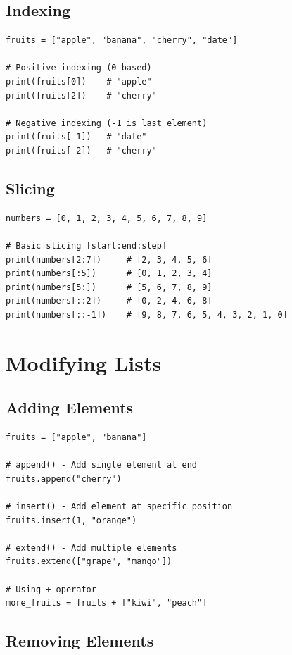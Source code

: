 \documentclass[12pt,a4paper]{article}
\begin{document}
\subsection{Indexing}

\begin{lstlisting}
fruits = ["apple", "banana", "cherry", "date"]

# Positive indexing (0-based)
print(fruits[0])    # "apple"
print(fruits[2])    # "cherry"

# Negative indexing (-1 is last element)
print(fruits[-1])   # "date"
print(fruits[-2])   # "cherry"
\end{lstlisting}

\subsection{Slicing}

\begin{lstlisting}
numbers = [0, 1, 2, 3, 4, 5, 6, 7, 8, 9]

# Basic slicing [start:end:step]
print(numbers[2:7])     # [2, 3, 4, 5, 6]
print(numbers[:5])      # [0, 1, 2, 3, 4]
print(numbers[5:])      # [5, 6, 7, 8, 9]
print(numbers[::2])     # [0, 2, 4, 6, 8]
print(numbers[::-1])    # [9, 8, 7, 6, 5, 4, 3, 2, 1, 0]
\end{lstlisting}

\section{Modifying Lists}

\subsection{Adding Elements}

\begin{lstlisting}
fruits = ["apple", "banana"]

# append() - Add single element at end
fruits.append("cherry")

# insert() - Add element at specific position
fruits.insert(1, "orange")

# extend() - Add multiple elements
fruits.extend(["grape", "mango"])

# Using + operator
more_fruits = fruits + ["kiwi", "peach"]
\end{lstlisting}

\subsection{Removing Elements}
\end{document}
